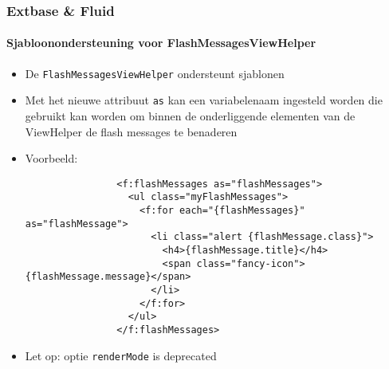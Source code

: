 
\begin{frame}[fragile]
	\frametitle{Extbase \& Fluid}
	\framesubtitle{Sjabloonondersteuning voor FlashMessagesViewHelper}

	\lstset{basicstyle=\tiny\ttfamily}

	\begin{itemize}

		\item De \texttt{FlashMessagesViewHelper} ondersteunt sjablonen

		\item Met het nieuwe attribuut \texttt{as} kan een variabelenaam ingesteld worden die gebruikt kan worden
			om binnen de onderliggende elementen van de ViewHelper de flash messages te benaderen

		\item Voorbeeld:

			\begin{lstlisting}
				<f:flashMessages as="flashMessages">
				  <ul class="myFlashMessages">
				    <f:for each="{flashMessages}" as="flashMessage">
				      <li class="alert {flashMessage.class}">
				        <h4>{flashMessage.title}</h4>
				        <span class="fancy-icon">{flashMessage.message}</span>
				      </li>
				    </f:for>
				  </ul>
				</f:flashMessages>
			\end{lstlisting}

		\item Let op: optie \texttt{renderMode} is deprecated

	\end{itemize}

\end{frame}


